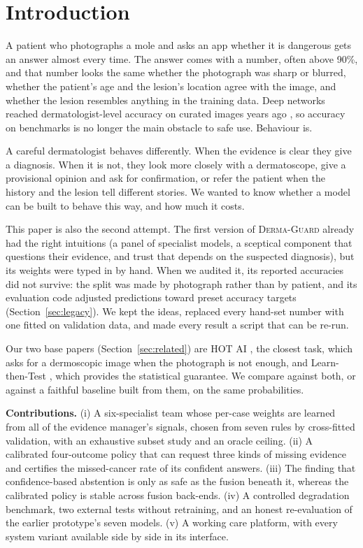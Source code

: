 \documentclass[conference]{IEEEtran}
\newcommand{\dguard}{\textsc{Derma-Guard}}
\begin{document}
\section{Introduction}

A patient who photographs a mole and asks an app whether it is dangerous gets an answer
almost every time. The answer comes with a number, often above 90\%, and that number
looks the same whether the photograph was sharp or blurred, whether the patient's age
and the lesion's location agree with the image, and whether the lesion resembles
anything in the training data. Deep networks reached dermatologist-level accuracy on
curated images years ago \cite{esteva2017}, so accuracy on benchmarks is no longer the
main obstacle to safe use. Behaviour is.

A careful dermatologist behaves differently. When the evidence is clear they give a
diagnosis. When it is not, they look more closely with a dermatoscope, give a provisional
opinion and ask for confirmation, or refer the patient when the history and the lesion
tell different stories. We wanted to know whether a model can be built to behave this way,
and how much it costs.

This paper is also the second attempt. The first version of \dguard{} already had the
right intuitions (a panel of specialist models, a sceptical component that questions
their evidence, and trust that depends on the suspected diagnosis), but its weights were
typed in by hand. When we audited it, its reported accuracies did not survive: the split
was made by photograph rather than by patient, and its evaluation code adjusted
predictions toward preset accuracy targets (Section~\ref{sec:legacy}). We kept the ideas,
replaced every hand-set number with one fitted on validation data, and made every result
a script that can be re-run.

Our two base papers (Section~\ref{sec:related}) are HOT AI \cite{mehta2025hotai}, the closest task, which asks for a dermoscopic image when the photograph is not enough, and Learn-then-Test \cite{angelopoulos2025ltt}, which provides the statistical guarantee. We compare against both, or against a faithful baseline built from them, on the same probabilities.

\textbf{Contributions.} (i) A six-specialist team whose per-case weights are learned from
all of the evidence manager's signals, chosen from seven rules by cross-fitted validation,
with an exhaustive subset study and an oracle ceiling. (ii) A calibrated four-outcome
policy that can request three kinds of missing evidence and certifies the missed-cancer
rate of its confident answers. (iii) The finding that confidence-based abstention is only
as safe as the fusion beneath it, whereas the calibrated policy is stable across fusion
back-ends. (iv) A controlled degradation benchmark, two external tests without retraining,
and an honest re-evaluation of the earlier prototype's seven models. (v) A working care
platform, with every system variant available side by side in its interface.
\end{document}
